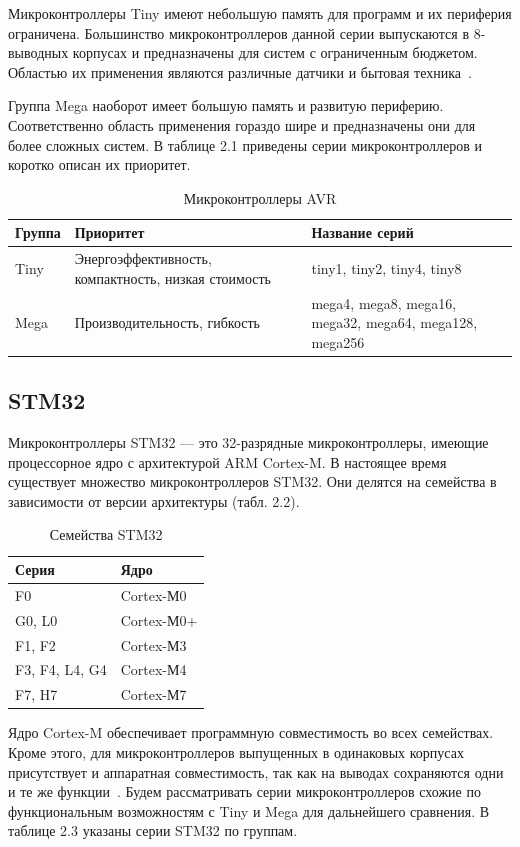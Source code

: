 	Микроконтроллеры Tiny имеют небольшую память для программ и их периферия ограничена. Большинство микроконтроллеров данной серии выпускаются в 8-выводных корпусах и предназначены для систем с ограниченным бюджетом. Областью их применения являются различные датчики и бытовая техника~\cite{avr}.
	
	Группа Mega наоборот имеет большую память и развитую периферию. Соответственно область применения гораздо шире и предназначены они для более сложных систем. В таблице 2.1 приведены серии микроконтроллеров и коротко описан их приоритет.

\begin{table}[H]
\caption{Микроконтроллеры AVR}
\begin{tabular}{|p{3.25 cm}|p{8 cm}|p{4 cm}|}
\hline
Группа & Приоритет & Название серий \\ \hline
Tiny & Энергоэффективность, компактность, низкая стоимость & tiny1, tiny2, tiny4, tiny8 \\ \hline
Mega & Производительность, гибкость & mega4, mega8, mega16, mega32, mega64, mega128, mega256 \\ \hline
\end{tabular}
\end{table}

\subsection{STM32}
	Микроконтроллеры STM32 --- это 32-разрядные микроконтроллеры, имеющие процессорное ядро с архитектурой ARM Cortex-M. В настоящее время существует множество микроконтроллеров STM32. Они делятся на семейства в зависимости от версии архитектуры (табл. 2.2).

\begin{table}[H]
\caption{Семейства STM32}
\begin{tabular}{|p{4 cm}|p{4 cm}|}
\hline
Серия & Ядро \\ \hline
F0  & Cortex-М0 \\ \hline
G0, L0  & Cortex-М0+ \\ \hline
F1, F2  & Cortex-М3 \\ \hline
F3, F4, L4, G4  & Cortex-М4 \\ \hline
F7, H7  & Cortex-М7 \\ \hline
\end{tabular}
\end{table}

	Ядро Cortex-M обеспечивает программную совместимость во всех семействах. Кроме этого, для микроконтроллеров выпущенных в одинаковых корпусах присутствует и аппаратная совместимость, так как на выводах сохраняются одни и те же функции~\cite{stm}. Будем рассматривать серии микроконтроллеров схожие по функциональным возможностям с Tiny и Mega для дальнейшего сравнения. В таблице 2.3 указаны серии STM32 по группам.
	
